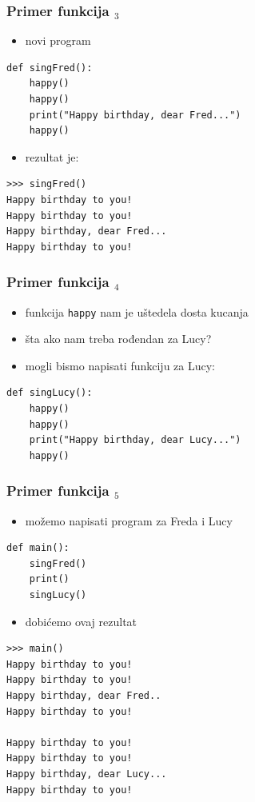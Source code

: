\documentclass[compress]{beamer}
\begin{document}
\begin{frame}[fragile]
  \frametitle{Primer funkcija $_3$}
  \begin{itemize}
    \item novi program
  \end{itemize}
\begin{verbatim}
def singFred():
    happy()
    happy()
    print("Happy birthday, dear Fred...")
    happy()
\end{verbatim}
  \begin{itemize}
    \item rezultat je:
  \end{itemize}
\begin{verbatim}
>>> singFred()
Happy birthday to you!
Happy birthday to you!
Happy birthday, dear Fred...
Happy birthday to you!
\end{verbatim}
\end{frame}

\begin{frame}[fragile]
  \frametitle{Primer funkcija $_4$}
  \begin{itemize}
    \item funkcija \texttt{happy} nam je uštedela dosta kucanja
    \item šta ako nam treba rođendan za Lucy?
    \item mogli bismo napisati funkciju za Lucy:
  \end{itemize}
\begin{verbatim}
def singLucy():
    happy()
    happy()
    print("Happy birthday, dear Lucy...")
    happy()
\end{verbatim}
\end{frame}

\begin{frame}[fragile,shrink=10]
  \frametitle{Primer funkcija $_5$}
  \begin{itemize}
    \item možemo napisati program za Freda i Lucy
  \end{itemize}
\begin{verbatim}
def main():
    singFred()
    print()
    singLucy()
\end{verbatim}
  \begin{itemize}
    \item dobićemo ovaj rezultat
  \end{itemize}
\begin{verbatim}
>>> main()
Happy birthday to you!
Happy birthday to you!
Happy birthday, dear Fred..
Happy birthday to you!

Happy birthday to you!
Happy birthday to you!
Happy birthday, dear Lucy...
Happy birthday to you!
\end{verbatim}
\end{frame}
\end{document}
